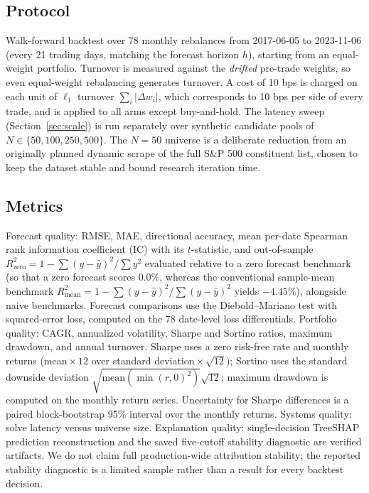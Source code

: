 \documentclass[conference]{IEEEtran}
\begin{document}
\subsection{Protocol}
\label{sec:protocol}
Walk-forward backtest over 78 monthly rebalances from 2017-06-05 to
2023-11-06 (every 21 trading days, matching the forecast horizon $h$),
starting from an equal-weight portfolio. Turnover is measured against
the \emph{drifted} pre-trade weights, so even equal-weight
rebalancing generates turnover. A cost of 10 bps is charged on each
unit of $\ell_1$ turnover $\sum_i|\Delta w_i|$, which corresponds to
10 bps per side of every trade, and is applied to all arms except
buy-and-hold. The latency sweep (Section~\ref{sec:scale}) is run
separately over synthetic candidate pools of $N \in
\{50,100,250,500\}$. The $N=50$ universe is a deliberate reduction from
an originally planned dynamic scrape of the full S\&P 500 constituent
list, chosen to keep the dataset stable and bound research iteration
time.

\subsection{Metrics}
Forecast quality: RMSE, MAE, directional accuracy, mean per-date
Spearman rank information coefficient (IC) with its $t$-statistic, and
out-of-sample $R^2_{\text{zero}} = 1-\sum(y-\hat{y})^2/\sum y^2$
evaluated relative to a zero forecast benchmark (so that a zero forecast
scores $0.0\%$, whereas the conventional sample-mean benchmark
$R^2_{\text{mean}} = 1-\sum(y-\hat{y})^2/\sum(y-\bar{y})^2$ yields $-4.45\%$),
alongside naive benchmarks. Forecast comparisons
use the Diebold--Mariano test \cite{dm1995} with squared-error loss,
computed on the 78 date-level loss differentials. Portfolio quality:
CAGR, annualized volatility, Sharpe and Sortino ratios, maximum
drawdown, and annual turnover. Sharpe uses a zero risk-free rate and
monthly returns (mean${}\times12$ over standard deviation${}\times
\sqrt{12}$); Sortino uses the standard downside deviation
$\sqrt{\mathrm{mean}(\min(r,0)^2)}\sqrt{12}$; maximum drawdown is
computed on the monthly return series. Uncertainty for Sharpe
differences is a paired block-bootstrap 95\% interval over the monthly
returns. Systems quality: solve latency versus universe size.
Explanation quality: single-decision TreeSHAP prediction reconstruction and
the saved five-cutoff stability diagnostic are verified artifacts. We do not
claim full production-wide attribution stability; the reported stability
diagnostic is a limited sample rather than a result for every backtest
decision.
\end{document}
